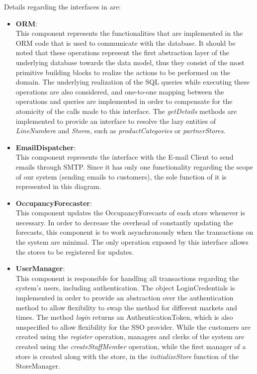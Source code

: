 Details regarding the interfaces in  are:
\begin{itemize}
    \item \textbf{ORM}: \\
    This component represents the functionalities that are implemented in the ORM code that is used to communicate with the database.
    It should be noted that these operations represent the first abstraction layer of the underlying database towards the data model, thus they consist of the most primitive building blocks to realize the actions to be performed on the domain.
    The underlying realization of the SQL queries while executing these operations are also considered, and one-to-one mapping between the operations and queries are implemented in order to compensate for the atomicity of the calls made to this interface.
    The \textit{getDetails} methods are implemented to provide an interface to resolve the lazy entities of \textit{LineNumber}s and \textit{Store}s, such as \textit{productCategories} or \textit{partnerStores}.
    \item \textbf{EmailDispatcher}: \\
    This component represents the interface with the E-mail Client to send emails through SMTP.
    Since it has only one functionality regarding the scope of our system (sending emails to customers), the sole function of it is represented in this diagram.
    \item \textbf{OccupancyForecaster}: \\
    This component updates the OccupancyForecasts of each store whenever is necessary.
    In order to decrease the overhead of constantly updating the forecasts, this component is to work asynchronously when the transactions on the system are minimal.
    The only operation exposed by this interface allows the stores to be registered for updates.
    \item \textbf{UserManager}: \\
    This component is responsible for handling all transactions regarding the system's users, including authentication.
    The object LoginCredentials is implemented in order to provide an abstraction over the authentication method to allow flexibility to swap the method for different markets and times.
    The method \textit{login} returns an AuthenticationToken, which is also unspecified to allow flexibility for the SSO provider.
    While the customers are created using the \textit{register} operation, managers and clerks of the system are created using the \textit{createStaffMember} operation, while the first manager of a store is created along with the store, in the \textit{initializeStore} function of the StoreManager.

\end{itemize}
